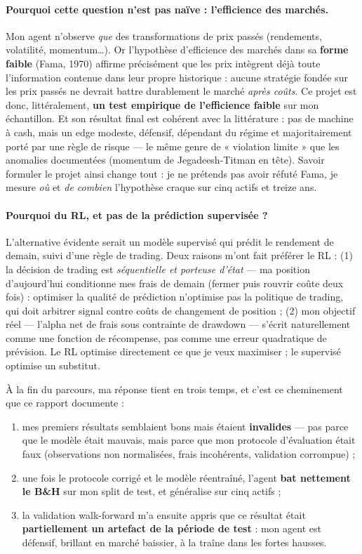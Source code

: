 \documentclass[11pt,a4paper]{article}
\begin{document}
\paragraph{Pourquoi cette question n'est pas naïve : l'efficience des marchés.}
Mon agent n'observe \emph{que} des transformations de prix passés (rendements,
volatilité, momentum\ldots). Or l'hypothèse d'efficience des marchés dans sa
\textbf{forme faible} (Fama, 1970) affirme précisément que les prix intègrent déjà
toute l'information contenue dans leur propre historique : aucune stratégie fondée sur
les prix passés ne devrait battre durablement le marché \emph{après coûts}. Ce projet
est donc, littéralement, \textbf{un test empirique de l'efficience faible} sur mon
échantillon. Et son résultat final est cohérent avec la littérature : pas de machine à
cash, mais un edge modeste, défensif, dépendant du régime et majoritairement porté par
une règle de risque --- le même genre de « violation limite » que les anomalies
documentées (momentum de Jegadeesh-Titman en tête). Savoir formuler le projet ainsi
change tout : je ne prétends pas avoir réfuté Fama, je mesure \emph{où} et \emph{de
combien} l'hypothèse craque sur cinq actifs et treize ans.

\paragraph{Pourquoi du RL, et pas de la prédiction supervisée ?} L'alternative évidente
serait un modèle supervisé qui prédit le rendement de demain, suivi d'une règle de
trading. Deux raisons m'ont fait préférer le RL : (1) la décision de trading est
\emph{séquentielle et porteuse d'état} --- ma position d'aujourd'hui conditionne mes
frais de demain (fermer puis rouvrir coûte deux fois) : optimiser la qualité de
prédiction n'optimise pas la politique de trading, qui doit arbitrer signal contre
coûts de changement de position ; (2) mon objectif réel --- l'alpha net de frais sous
contrainte de drawdown --- s'écrit naturellement comme une fonction de récompense, pas
comme une erreur quadratique de prévision. Le RL optimise directement ce que je veux
maximiser ; le supervisé optimise un substitut.

À la fin du parcours, ma réponse tient en trois temps, et c'est ce cheminement que ce
rapport documente :
\begin{enumerate}[itemsep=2pt]
  \item mes premiers résultats semblaient bons mais étaient \textbf{invalides} --- pas
        parce que le modèle était mauvais, mais parce que mon protocole d'évaluation
        était faux (observations non normalisées, frais incohérents, validation
        corrompue) ;
  \item une fois le protocole corrigé et le modèle réentraîné, l'agent \textbf{bat
        nettement le B\&H} sur mon split de test, et généralise sur cinq actifs ;
  \item la validation walk-forward m'a ensuite appris que ce résultat était
        \textbf{partiellement un artefact de la période de test} : mon agent est
        défensif, brillant en marché baissier, à la traîne dans les fortes hausses.
\end{enumerate}
\end{document}
